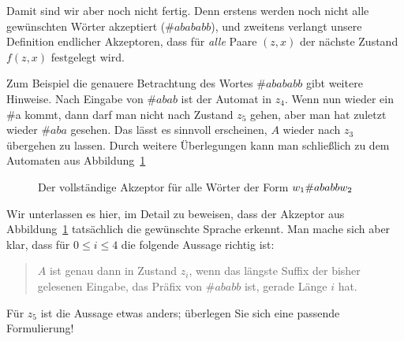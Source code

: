 Damit sind wir aber noch nicht fertig. Denn erstens werden noch nicht
alle gewünschten Wörter akzeptiert (\zB $\#{abababb}$), und zweitens
verlangt unsere Definition endlicher Akzeptoren, dass für \emph{alle}
Paare $(z,x)$ der nächste Zustand $f(z,x)$ festgelegt wird.

Zum Beispiel die genauere Betrachtung des Wortes $\#{abababb}$ gibt
weitere Hinweise. Nach Eingabe von $\#{abab}$ ist der Automat in
$z_4$. Wenn nun wieder ein \#a kommt, dann darf man nicht nach Zustand
$z_5$ gehen, aber man hat zuletzt wieder $\#{aba}$ gesehen. Das lässt
es sinnvoll erscheinen, $A$ wieder nach $z_3$ übergehen zu lassen.
Durch weitere Überlegungen kann man schließlich zu dem Automaten aus
Abbildung~\ref{fig:akzeptor-ababb-voll}

\begin{figure}[ht]
  \centering
  \caption{Der vollständige Akzeptor für alle Wörter der Form $w_1\protect\#{ababb}w_2$}
  \label{fig:akzeptor-ababb-voll}
\end{figure}

Wir unterlassen es hier, im Detail zu beweisen, dass der Akzeptor aus
Abbildung~\ref{fig:akzeptor-ababb-voll} tatsächlich die gewünschte
Sprache erkennt. Man mache sich aber klar, dass für $0\leq i\leq 4$
die folgende Aussage richtig ist:
%
\begin{quote}
  $A$ ist genau dann in Zustand $z_i$, wenn das längste Suffix der
  bisher gelesenen Eingabe, das Präfix von $\#{ababb}$ ist, gerade
  Länge $i$ hat.
\end{quote}
%
Für $z_5$ ist die Aussage etwas anders; überlegen Sie sich eine
passende Formulierung!


